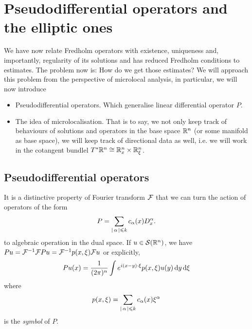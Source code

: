 \documentclass{article}
\begin{document}
%
%
%

\section{Pseudodifferential operators and the elliptic ones} 
We have now relate Fredholm operators with existence, uniqueness and, importantly, regularity of its solutions and has reduced Fredholm conditions to estimates. The problem now is: How do we get those estimates? 
We will approach this problem from the perspective of microlocal analysis, in particular, we will now introduce
\begin{itemize}
    \item Pseudodifferential operators. Which generalise linear differential operator $P$.
    \item The idea of microlocalisation. That is to say, we not only keep track of behaviours of solutions and operators in the base space $\R^n$ (or some manifold as base space), we will keep track of directional data as well, i.e. we will work in the cotangent bundlel $T^* \R^n \cong \R^n_x \times \R^n_\xi $. 
\end{itemize}

\subsection{Pseudodifferential operators} 
It is a distinctive property of Fourier transform $\F$ that we can turn the action of operators of the form 
\begin{align*}
P = \sum_{\abs{\alpha} \leq k} c_\alpha(x) D^\alpha_x. 
\end{align*}
to algebraic operation in the dual space. If $u \in \sch(\R^n)$, we have $P u = \F^{-1} \F Pu = \F^{-1}p(x, \xi) \F u$ or explicitly, 
\begin{align*}
P u(x) = \frac{1}{(2\pi)^n} \int e^{i(x - y) \cdot \xi} p(x, \xi) u(y) \d[y] \d[\xi] 
\end{align*}
where 
\begin{align*}
p(x, \xi) = \sum_{\abs{\alpha} \leq k} c_\alpha(x) \xi^\alpha
\end{align*}
is the \emph{symbol} of $P$. 
\end{document}
